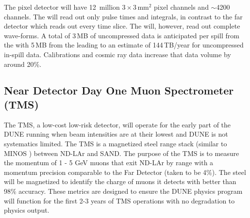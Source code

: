 \documentclass[../main-v1.tex]{subfiles}
\begin{document}
 The pixel  detector will have 12~million $3 \times 3$\,mm$^2$ pixel channels and $\sim$4200  channels.  The  will read out only pulse times and integrals, in contrast to the far detector which reads out every time slice.  The  will, however, read out complete wave-forms.   A total of 3\,MB of uncompressed data is anticipated per spill from the  with 5\,MB from the  leading to an estimate of 144\,TB/year for uncompressed in-spill data. Calibrations and cosmic ray data increase that data volume by around 20\%.




\subsection{Near Detector Day One Muon Spectrometer (TMS) }
\label{sec:comp-dataestimates-mpd}

The TMS, a low-cost low-risk detector, will operate for the early part of the DUNE running when beam intensities are at their lowest and DUNE is not systematics limited. The TMS is a magnetized steel range stack (similar to MINOS \cite{minosNIM}) between ND-LAr and SAND.  The purpose of the TMS is to measure the momentum of 1 - 5 GeV muons that exit ND-LAr by range with a momentum precision comparable to the Far Detector (taken to be 4\%). The steel will be magnetized to identify the charge of muons it detects with better than 98\% accuracy. These metrics are designed to ensure the DUNE physics program will function for the first 2-3 years of TMS operations with no degradation to physics output.
\end{document}
